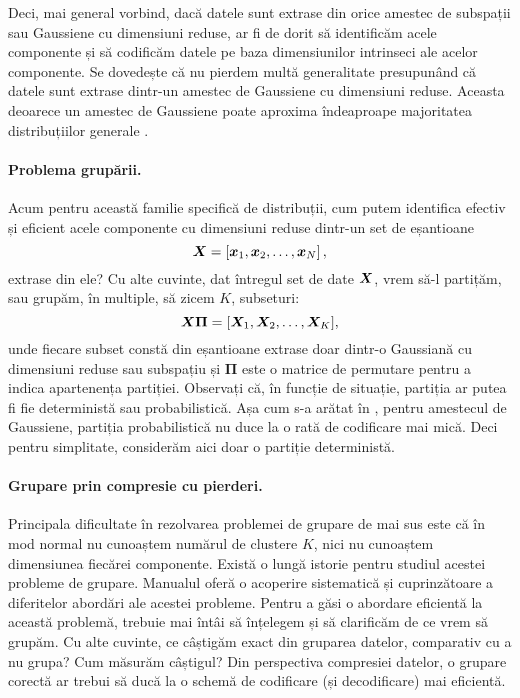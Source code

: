 \documentclass[../../book-main_ro.tex]{subfiles}
\begin{document}
Deci, mai general vorbind, dacă datele sunt extrase din orice amestec de subspații sau Gaussiene cu dimensiuni reduse, ar fi de dorit să identificăm acele componente și să codificăm datele pe baza dimensiunilor intrinseci ale acelor componente. Se dovedește că nu pierdem multă generalitate presupunând că datele sunt extrase dintr-un amestec de Gaussiene cu dimensiuni reduse. Aceasta deoarece un amestec de Gaussiene poate aproxima îndeaproape majoritatea distribuțiilor generale \cite{borkar2016gaussian}.

\paragraph{Problema grupării.}
Acum pentru această familie specifică de distribuții, cum putem identifica efectiv și eficient acele componente cu dimensiuni reduse dintr-un set de eșantioane
\begin{equation}
	\bm{X} = \left[\bm{x}_1, \bm{x}_2, \ldots, \bm{x}_N\right],
\end{equation}
extrase din ele? Cu alte cuvinte, dat întregul set de date $\bm{X}$, vrem să-l partițăm, sau grupăm, în multiple, să zicem $K$, subseturi:
\begin{equation}
	\bm{X}\bm \Pi = [\bm{X}_1, \bm{X}_2, \dots, \bm{X}_K],
\end{equation}
unde fiecare subset constă din eșantioane extrase doar dintr-o Gaussiană cu dimensiuni reduse sau subspațiu și $\bm \Pi$ este o matrice de permutare pentru a indica apartenența partiției. Observați că, în funcție de situație, partiția ar putea fi fie deterministă sau probabilistică. Așa cum s-a arătat în \cite{ma2007segmentation}, pentru amestecul de Gaussiene, partiția probabilistică nu duce la o rată de codificare mai mică. Deci pentru simplitate, considerăm aici doar o partiție deterministă.

\paragraph{Grupare prin compresie cu pierderi.}
Principala dificultate în rezolvarea problemei de grupare de mai sus este că în mod normal nu cunoaștem numărul de clustere $K$, nici nu cunoaștem dimensiunea fiecărei componente. Există o lungă istorie pentru studiul acestei probleme de grupare. Manualul \cite{GPCA} oferă o acoperire sistematică și cuprinzătoare a diferitelor abordări ale acestei probleme. Pentru a găsi o abordare eficientă la această problemă, trebuie mai întâi să înțelegem și să clarificăm de ce vrem să grupăm. Cu alte cuvinte, ce câștigăm exact din gruparea datelor, comparativ cu a nu grupa? Cum măsurăm câștigul? Din perspectiva compresiei datelor, o grupare corectă ar trebui să ducă la o schemă de codificare (și decodificare) mai eficientă.
\end{document}
